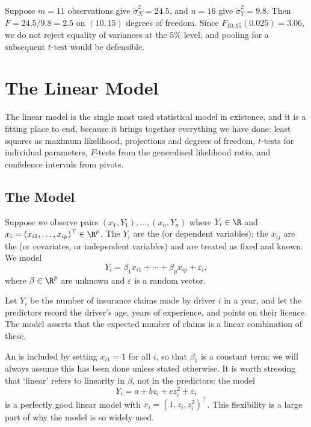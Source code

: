 \begin{example}
  Suppose $m = 11$ observations give $\tilde\sigma_X^2 = 24.5$, and $n = 16$ give $\tilde\sigma_Y^2 = 9.8$. Then $F = 24.5/9.8 = 2.5$ on $(10, 15)$ degrees of freedom. Since $F_{10,15}(0.025) = 3.06$, we do not reject equality of variances at the $5\%$ level, and pooling for a subsequent $t$-test would be defensible.
\end{example}


\section{The Linear Model}

The linear model is the single most used statistical model in existence, and it is a fitting place to end, because it brings together everything we have done: least squares as maximum likelihood, projections and degrees of freedom, $t$-tests for individual parameters, $F$-tests from the generalised likelihood ratio, and confidence intervals from pivots.

\subsection{The Model}

Suppose we observe pairs $(x_1, Y_1),\dots,(x_n,Y_n)$ where $Y_i \in \R$ and $x_i = (x_{i1},\dots,x_{ip})^\top\in\R^p$. The $Y_i$ are the  (or dependent variables); the $x_{ij}$ are the  (or covariates, or independent variables) and are treated as fixed and known. We model
$$
Y_i = \beta_1 x_{i1} + \cdots + \beta_p x_{ip} + \varepsilon_i,
$$
where $\beta \in \R^p$ are unknown  and $\varepsilon$ is a random  vector.

\begin{example}
  Let $Y_i$ be the number of insurance claims made by driver $i$ in a year, and let the predictors record the driver's age, years of experience, and points on their licence. The model asserts that the expected number of claims is a linear combination of these.
\end{example}

An  is included by setting $x_{i1} = 1$ for all $i$, so that $\beta_1$ is a constant term; we will always assume this has been done unless stated otherwise. It is worth stressing that `linear' refers to linearity in $\beta$, not in the predictors: the model
$$
Y_i = a + bz_i + cz_i^2 + \varepsilon_i
$$
is a perfectly good linear model with $x_i = (1, z_i, z_i^2)^\top$. This flexibility is a large part of why the model is so widely used.

